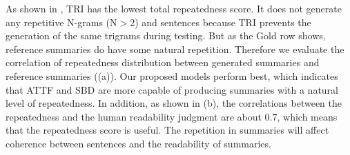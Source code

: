 As shown in , TRI has the lowest total repeatedness score.
It does not generate any repetitive N-grams (N$>$2) and sentences 
because TRI prevents the generation of the same trigrams during testing.
But as the Gold row shows, reference summaries do have some natural repetition.
Therefore we evaluate the correlation of repeatedness distribution between
generated summaries and reference summaries ((a)).
Our proposed models perform best,
which indicates that ATTF and SBD are more capable of producing summaries with a natural level of repeatedness.
In addition, as shown in (b), the correlations between the repeatedness and the human readability judgment are about 0.7, which means that the repeatedness score is useful. The repetition in summaries will affect coherence between sentences and the readability of summaries.

